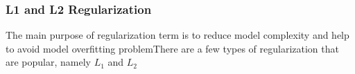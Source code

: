 \subsubsection{L1 and L2 Regularization}

The main purpose of regularization term is to reduce model complexity and help to avoid model overfitting problemThere are a few types of regularization that are popular, namely $L_1$ and $L_2$